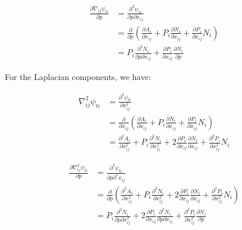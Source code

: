 \documentclass{article}
\begin{document}
\begin{equation}
\begin{split}
  \frac {\partial \nabla_{ij} \psi_{ti}} {\partial p} &= \frac {\partial^2 \psi_{ti}} {\partial p \partial x_{ij}} \\
  &= \frac {\partial} {\partial p} \left( \frac {\partial A_i} {\partial x_{ij}} + P_i \frac {\partial N_i} {\partial x_{ij}} + \frac {\partial P_i} {\partial x_{ij}} N_i \right) \\
  &= P_i \frac {\partial^2 N_i} {\partial p \partial x_{ij}} + \frac {\partial P_i} {\partial x_{ij}} \frac {\partial N_i} {\partial p}
\end{split}
\end{equation}

For the Laplacian components, we have:

\begin{equation}
\begin{split}
  \nabla^2_{ij} \psi_{ti} &= \frac {\partial^2 \psi_{ti}} {\partial x_{ij}^2} \\
  &= \frac {\partial} {\partial x_{ij}} \left( \frac {\partial A_i} {\partial x_{ij}} + P_i \frac {\partial N_i} {\partial x_{ij}} + \frac {\partial P_i} {\partial x_{ij}} N_i \right) \\
  &= \frac {\partial^2 A_i} {\partial x_{ij}^2} + P_i \frac {\partial^2 N_i} {\partial x_{ij}^2} + 2 \frac {\partial P_i} {\partial x_{ij}} \frac {\partial N_i} {\partial x_{ij}} + \frac {\partial^2 P_i} {\partial x_{ij}^2} N_i
\end{split}
\end{equation}

\begin{equation}
\begin{split}
  \frac {\partial \nabla_{ij}^2 \psi_{ti}} {\partial p} &= \frac {\partial^3 \psi_{ti}} {\partial p \partial^2 x_{ij}} \\
  &= \frac {\partial} {\partial p} \left( \frac {\partial^2 A_i} {\partial x_{ij}^2} + P_i \frac {\partial^2 N_i} {\partial x_{ij}^2} + 2 \frac {\partial P_i} {\partial x_{ij}} \frac {\partial N_i} {\partial x_{ij}} + \frac {\partial^2 P_i} {\partial x_{ij}^2} N_i \right) \\
  &= P_i \frac {\partial^3 N_i} {\partial p \partial x_{ij}^2} + 2 \frac {\partial P_i} {\partial x_{ij}} \frac {\partial^2 N_i} {\partial p \partial x_{ij}} + \frac {\partial^2 P_i} {\partial x_{ij}^2} \frac {\partial N_i} {\partial p}
\end{split}
\end{equation}
\end{document}
